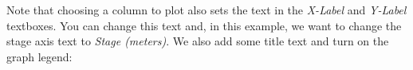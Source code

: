 \documentclass{manual}
\begin{document}
\begin{figure}[ht]
  \centerline{}
  \label{fig:winsetpath1}
\end{figure}

\pagebreak

Note that choosing a column to plot also sets the text in the \emph{X-Label} and \emph{Y-Label}
textboxes.  You can change this text and, in this example, we want to change the stage axis text 
to \emph{Stage (meters)}.  We also add some title text and turn on the graph legend:
\end{document}
